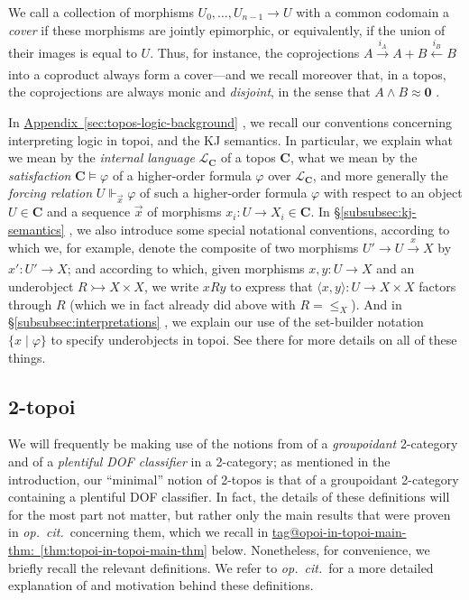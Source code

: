 \documentclass{amsart}
\makeatletter
\newcommand\bC{\mathbf{C}}
\newcommand\br[1]{\langle{}#1\rangle{}}
\newcommand\cL{\mathcal{L}}
\newcommand\opcitspace{\textit{op.~cit.}\ }
\renewcommand\phi{\varphi}
\newcommand\set[2][]{#1\{ #2 #1\}}
\newcommand\tox[2][]{\xrightarrow[#1]{#2}}
\newcommand\tto{\rightarrowtail}
\newcommand\vek[1]{{\vec{#1}}}
\newcommand\vx{\vek{x}}
\newcommand\xot[2][]{\xleftarrow[#1]{#2}}
\newcommand\zset{\mathbf{0}}
\newcommand\tagword[1]{\csname tag@#1\endcsname}
\def\label@tag#1:#2\@nil{#1}
\newcommand\labeltag[1]{\label@tag#1:\@nil}
\newcommand\jref[1]{%
  \texorpdfstring%
    {\hyperref[#1]{\tagword{\labeltag{#1}}~\ref*{#1}}}%
    {\tagword{\labeltag{#1}}~\ref*{#1}}%
}
\newcommand\prerefpost[3]{%
  \texorpdfstring%
    {\hyperref[#2]{#1\ref*{#2}#3}}%
    {#1\ref*{#2}#3}%
}
\newcommand\sref[1]{\prerefpost{\S}{#1}{}}
\newcommand\aref[1]{\prerefpost{Appendix~}{#1}{}}
\theoremstyle{definition}
\theoremstyle{remark}
\theoremstyle{plainwithref}
\makeatother
\begin{document}
We call a collection of morphisms \( U_0,\ldots,U_{n - 1} \to U \) with a common codomain a \emph{cover} if these morphisms are jointly epimorphic, or equivalently, if the union of their images is equal to \( U \).
Thus, for instance, the coprojections \( A \tox{i_A} A + B \xot{i_B} B \) into a coproduct always form a cover---and we recall moreover that, in a topos, the coprojections are always monic and \emph{disjoint}, in the sense that \( A \wedge B \approx \zset \) \cite[Corollary~1.57]{johnstone-topos-theory}.

In \aref{sec:topos-logic-background}, we recall our conventions concerning interpreting logic in topoi, and the KJ semantics.
In particular, we explain what we mean by the \emph{internal language} \( \cL_\bC \) of a topos \( \bC \), what we mean by the \emph{satisfaction} \( \bC \vDash \phi \) of a higher-order formula \( \phi \) over \( \cL_\bC \), and more generally the \emph{forcing relation} \( U \Vdash_\vx \phi \) of such a higher-order formula \( \phi \) with respect to an object \( U \in \bC \) and a sequence \( \vx \) of morphisms \( x_i \colon U \to X_i \in \bC \).
In \sref{subsubsec:kj-semantics}, we also introduce some special notational conventions, according to which we, for example, denote the composite of two morphisms \( U' \to U \tox{x} X \) by \( x' \colon U' \to X \); and according to which, given morphisms \( x,y \colon U \to X \) and an underobject \( R \tto X \times X \), we write \( x R y \) to express that \( \br{x,y} \colon U \to X \times X \) factors through \( R \) (which we in fact already did above with \( R = {\le_X} \)).
And in \sref{subsubsec:interpretations}, we explain our use of the set-builder notation \( \set{x \mid \phi} \) to specify underobjects in topoi.
See there for more details on all of these things.

\subsection{2-topoi} \label{subsec:2-topoi-prelims}
We will frequently be making use of the notions from \cite{helfer-topoi-in-topoi} of a \emph{groupoidant} 2-category and of a \emph{plentiful DOF classifier} in a 2-category; as mentioned in the introduction, our ``minimal'' notion of 2-topos is that of a groupoidant 2-category containing a plentiful DOF classifier.
In fact, the details of these definitions will for the most part not matter, but rather only the main results that were proven in \opcitspace concerning them, which we recall in \jref{thm:topoi-in-topoi-main-thm} below.
Nonetheless, for convenience, we briefly recall the relevant definitions.
We refer to \opcitspace for a more detailed explanation of and motivation behind these definitions.
\end{document}
